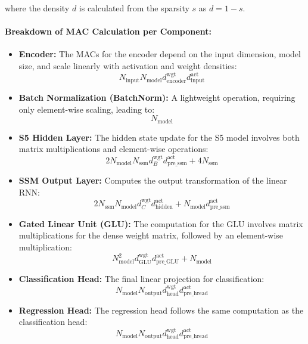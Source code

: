 where the density $d$ is calculated from the sparsity $s$ as $d=1-s$.

\paragraph{Breakdown of MAC Calculation per Component:}
\begin{itemize}
    \item \textbf{Encoder:} The MACs for the encoder depend on the input dimension, model size, and scale linearly with activation and weight densities:
        \begin{equation}    
            N_\text{input} N_\text{model} d^\text{wgt}_\text{encoder} d^\text{act}_\text{input}
        \end{equation}
    \item \textbf{Batch Normalization (BatchNorm):} A lightweight operation, requiring only element-wise scaling, leading to:
        \begin{equation}
            N_\text{model}
        \end{equation}
    \item \textbf{S5 Hidden Layer:} The hidden state update for the S5 model involves both matrix multiplications and element-wise operations:
        \begin{equation}
            2N_\text{model} N_\text{ssm} d^\text{wgt}_B d^\text{act}_\text{pre\_ssm} + 4 N_\text{ssm}
        \end{equation}
    \item \textbf{SSM Output Layer:} Computes the output transformation of the linear RNN:
        \begin{equation}
            2N_\text{ssm} N_\text{model} d^\text{wgt}_C d^\text{act}_\text{hidden} + N_\text{model} d^\text{act}_\text{pre\_ssm}
        \end{equation}
    \item \textbf{Gated Linear Unit (GLU):} The computation for the GLU involves matrix multiplications for the dense weight matrix, followed by an element-wise multiplication:
        \begin{equation}
            N_\text{model}^2 d^\text{wgt}_\text{GLU} d^\text{act}_\text{pre\_GLU} + N_\text{model}
        \end{equation}
    \item \textbf{Classification Head:} The final linear projection for classification:
        \begin{equation}
            N_\text{model} N_\text{output} d^\text{wgt}_\text{head} d^\text{act}_\text{pre\_hread}
        \end{equation}
    \item \textbf{Regression Head:} The regression head follows the same computation as the classification head:
        \begin{equation}
            N_\text{model} N_\text{output} d^\text{wgt}_\text{head} d^\text{act}_\text{pre\_hread}
        \end{equation}
\end{itemize}

